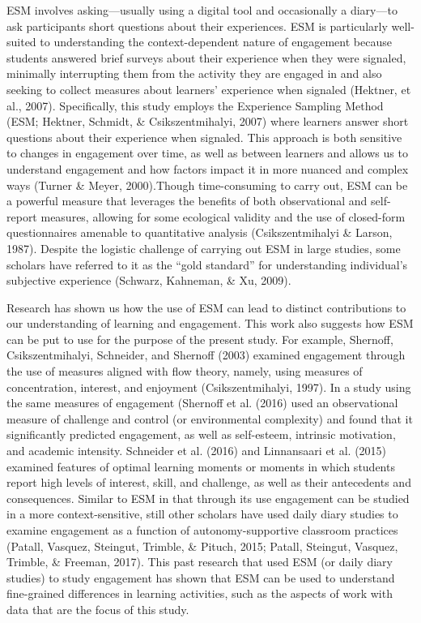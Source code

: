 \documentclass[]{msu-thesis}
\theoremstyle{definition}
\theoremstyle{definition}
\theoremstyle{definition}
\theoremstyle{remark}
\begin{document}
ESM involves asking---usually using a digital tool and occasionally a
diary---to ask participants short questions about their experiences. ESM
is particularly well-suited to understanding the context-dependent
nature of engagement because students answered brief surveys about their
experience when they were signaled, minimally interrupting them from the
activity they are engaged in and also seeking to collect measures about
learners' experience when signaled (Hektner, et al., 2007).
Specifically, this study employs the Experience Sampling Method (ESM;
Hektner, Schmidt, \& Csikszentmihalyi, 2007) where learners answer short
questions about their experience when signaled. This approach is both
sensitive to changes in engagement over time, as well as between
learners and allows us to understand engagement and how factors impact
it in more nuanced and complex ways (Turner \& Meyer, 2000).Though
time-consuming to carry out, ESM can be a powerful measure that
leverages the benefits of both observational and self-report measures,
allowing for some ecological validity and the use of closed-form
questionnaires amenable to quantitative analysis (Csikszentmihalyi \&
Larson, 1987). Despite the logistic challenge of carrying out ESM in
large studies, some scholars have referred to it as the ``gold
standard'' for understanding individual's subjective experience
(Schwarz, Kahneman, \& Xu, 2009).

Research has shown us how the use of ESM can lead to distinct
contributions to our understanding of learning and engagement. This work
also suggests how ESM can be put to use for the purpose of the present
study. For example, Shernoff, Csikszentmihalyi, Schneider, and Shernoff
(2003) examined engagement through the use of measures aligned with flow
theory, namely, using measures of concentration, interest, and enjoyment
(Csikszentmihalyi, 1997). In a study using the same measures of
engagement (Shernoff et al. (2016) used an observational measure of
challenge and control (or environmental complexity) and found that it
significantly predicted engagement, as well as self-esteem, intrinsic
motivation, and academic intensity. Schneider et al. (2016) and
Linnansaari et al. (2015) examined features of optimal learning moments
or moments in which students report high levels of interest, skill, and
challenge, as well as their antecedents and consequences. Similar to ESM
in that through its use engagement can be studied in a more
context-sensitive, still other scholars have used daily diary studies to
examine engagement as a function of autonomy-supportive classroom
practices (Patall, Vasquez, Steingut, Trimble, \& Pituch, 2015; Patall,
Steingut, Vasquez, Trimble, \& Freeman, 2017). This past research that
used ESM (or daily diary studies) to study engagement has shown that ESM
can be used to understand fine-grained differences in learning
activities, such as the aspects of work with data that are the focus of
this study.
\end{document}
